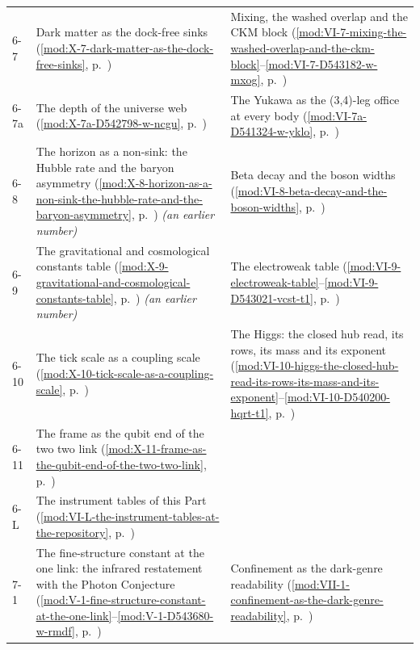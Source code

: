 {\begin{longtable}{p{11mm}p{70mm}p{60mm}}
6-7 & Dark matter as the dock-free sinks (\ref{mod:X-7-dark-matter-as-the-dock-free-sinks}, p.~\pageref{mod:X-7-dark-matter-as-the-dock-free-sinks}) & Mixing, the washed overlap and the CKM block (\ref{mod:VI-7-mixing-the-washed-overlap-and-the-ckm-block}--\ref{mod:VI-7-D543182-w-mxog}, p.~\pageref{mod:VI-7-mixing-the-washed-overlap-and-the-ckm-block}) \\
6-7a & The depth of the universe web (\ref{mod:X-7a-D542798-w-ncgu}, p.~\pageref{mod:X-7a-D542798-w-ncgu}) & The Yukawa as the (3,4)-leg office at every body (\ref{mod:VI-7a-D541324-w-yklo}, p.~\pageref{mod:VI-7a-D541324-w-yklo}) \\
6-8 & The horizon as a non-sink: the Hubble rate and the baryon asymmetry (\ref{mod:X-8-horizon-as-a-non-sink-the-hubble-rate-and-the-baryon-asymmetry}, p.~\pageref{mod:X-8-horizon-as-a-non-sink-the-hubble-rate-and-the-baryon-asymmetry}) \emph{(an earlier number)} & Beta decay and the boson widths (\ref{mod:VI-8-beta-decay-and-the-boson-widths}, p.~\pageref{mod:VI-8-beta-decay-and-the-boson-widths}) \\
6-9 & The gravitational and cosmological constants table (\ref{mod:X-9-gravitational-and-cosmological-constants-table}, p.~\pageref{mod:X-9-gravitational-and-cosmological-constants-table}) \emph{(an earlier number)} & The electroweak table (\ref{mod:VI-9-electroweak-table}--\ref{mod:VI-9-D543021-vcst-t1}, p.~\pageref{mod:VI-9-electroweak-table}) \\
6-10 & The tick scale as a coupling scale (\ref{mod:X-10-tick-scale-as-a-coupling-scale}, p.~\pageref{mod:X-10-tick-scale-as-a-coupling-scale}) & The Higgs: the closed hub read, its rows, its mass and its exponent (\ref{mod:VI-10-higgs-the-closed-hub-read-its-rows-its-mass-and-its-exponent}--\ref{mod:VI-10-D540200-hqrt-t1}, p.~\pageref{mod:VI-10-higgs-the-closed-hub-read-its-rows-its-mass-and-its-exponent}) \\
6-11 & The frame as the qubit end of the two two link (\ref{mod:X-11-frame-as-the-qubit-end-of-the-two-two-link}, p.~\pageref{mod:X-11-frame-as-the-qubit-end-of-the-two-two-link}) &  \\
6-L & The instrument tables of this Part (\ref{mod:VI-L-the-instrument-tables-at-the-repository}, p.~\pageref{mod:VI-L-the-instrument-tables-at-the-repository}) &  \\
7-1 & The fine-structure constant at the one link: the infrared restatement with the Photon Conjecture (\ref{mod:V-1-fine-structure-constant-at-the-one-link}--\ref{mod:V-1-D543680-w-rmdf}, p.~\pageref{mod:V-1-fine-structure-constant-at-the-one-link}) & Confinement as the dark-genre readability (\ref{mod:VII-1-confinement-as-the-dark-genre-readability}, p.~\pageref{mod:VII-1-confinement-as-the-dark-genre-readability}) \\

\end{longtable}}
